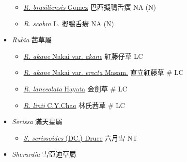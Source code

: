 \begin{itemize}
  \begin{itemize}
        \item[] \href{http://www.theplantlist.org/tpl1.1/search?q=Richardia+brasiliensis}{\textit{R. brasiliensis} Gomez}   巴西擬鴨舌癀   NA (N)
        \item[] \href{http://www.theplantlist.org/tpl1.1/search?q=Richardia+scabra}{\textit{R. scabra} L.}   擬鴨舌癀   NA (N)
  \end{itemize}
 \item[] \textit{Rubia} 茜草屬
                                
  \begin{itemize}
        \item[] \href{http://www.theplantlist.org/tpl1.1/search?q=Rubia+akane+var.+akane}{\textit{R. akane} Nakai var. \textit{akane}}   紅藤仔草   LC
        \item[] \href{http://www.theplantlist.org/tpl1.1/search?q=Rubia+akane+var.+erecta}{\textit{R. akane} Nakai var. \textit{erecta} Masam.}   直立紅藤草  \# LC
        \item[] \href{http://www.theplantlist.org/tpl1.1/search?q=Rubia+lanceolata}{\textit{R. lanceolata} Hayata}   金劍草  \# LC
        \item[] \href{http://www.theplantlist.org/tpl1.1/search?q=Rubia+linii}{\textit{R. linii} C.Y.Chao}   林氏茜草  \# LC
  \end{itemize}
 \item[] \textit{Serissa} 滿天星屬
                                
  \begin{itemize}
        \item[] \href{http://www.theplantlist.org/tpl1.1/search?q=Serissa+serissoides}{\textit{S. serissoides} (DC.) Druce}   六月雪   NT
  \end{itemize}
 \item[] \textit{Sherardia} 雪亞迪草屬
                                

\end{itemize}

